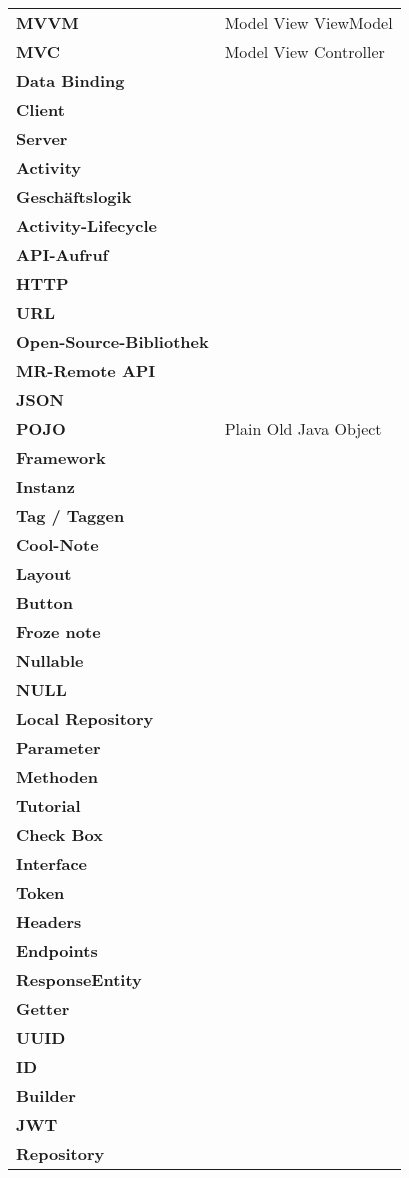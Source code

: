 \begin{table}[h!]
			\centering
			\label{my-label}
			\begin{tabular}{p{4cm}p{10cm}}
				\textbf{MVVM} & Model View ViewModel  \\
				\textbf{MVC} & Model View Controller  \\
				\textbf{Data Binding} &   \\
				\textbf{Client} &   \\
				
				\textbf{Server} &   \\
				\textbf{Activity} &   \\
				\textbf{Geschäftslogik} &   \\
				\textbf{Activity-Lifecycle} &   \\
				
				\textbf{API-Aufruf} &   \\
				\textbf{HTTP} &   \\
				\textbf{URL} &   \\
				\textbf{Open-Source-Bibliothek} &   \\
				
				\textbf{MR-Remote API} &   \\
				\textbf{JSON} &   \\
				\textbf{POJO} & Plain Old Java Object   \\
				\textbf{Framework} &   \\
				
				\textbf{Instanz} &   \\
				\textbf{Tag / Taggen} &   \\
				\textbf{Cool-Note} &   \\
				\textbf{Layout} &   \\
				
				\textbf{Button} &   \\
				\textbf{Froze note} &   \\
				\textbf{Nullable} &   \\
				\textbf{NULL} &   \\
				\textbf{Local Repository} &   \\
				\textbf{Parameter} &   \\
				\textbf{Methoden} &   \\
				\textbf{Tutorial} &   \\
				\textbf{Check Box} &   \\
				\textbf{Interface} &   \\
				\textbf{Token} &   \\
				\textbf{Headers} &   \\
				\textbf{Endpoints} &   \\
				\textbf{ResponseEntity} &   \\	
				\textbf{Getter} &   \\	
				\textbf{UUID} &   \\	
				\textbf{ID} &   \\	
				\textbf{Builder} &   \\	
				\textbf{JWT} &   \\	
				\textbf{Repository} &   \\	
				
			\end{tabular}
		\end{table}
	
		
